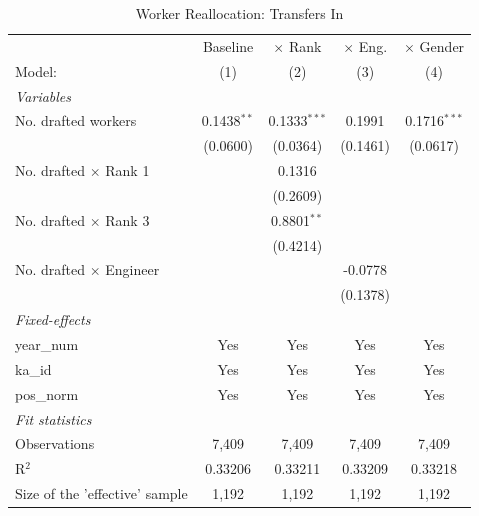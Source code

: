 \begin{table}[htbp]
\centering
\caption{Worker Reallocation: Transfers In}
\label{tab:reallocation}
\begin{threeparttable}
\begin{tabular}{lcccc}
   \tabularnewline \midrule \midrule
                                  & Baseline      & $\times$ Rank  & $\times$ Eng.  & $\times$ Gender \\    
   Model:                         & (1)           & (2)            & (3)            & (4)\\  
   \midrule
   \emph{Variables}\\
   No. drafted workers            & 0.1438$^{**}$ & 0.1333$^{***}$ & 0.1991         & 0.1716$^{***}$\\   
                                  & (0.0600)      & (0.0364)       & (0.1461)       & (0.0617)\\   
   No. drafted $\times$ Rank 1    &               & 0.1316         &                &   \\   
                                  &               & (0.2609)       &                &   \\   
   No. drafted $\times$ Rank 3    &               & 0.8801$^{**}$  &                &   \\   
                                  &               & (0.4214)       &                &   \\   
   No. drafted $\times$ Engineer  &               &                & -0.0778        &   \\   
                                  &               &                & (0.1378)       &   \\   
   \midrule
   \emph{Fixed-effects}\\
   year\_num                      & Yes           & Yes            & Yes            & Yes\\  
   ka\_id                         & Yes           & Yes            & Yes            & Yes\\  
   pos\_norm                      & Yes           & Yes            & Yes            & Yes\\  
   \midrule
   \emph{Fit statistics}\\
   Observations                   & 7,409         & 7,409          & 7,409          & 7,409\\  
   R$^2$                          & 0.33206       & 0.33211        & 0.33209        & 0.33218\\  
   Size of the 'effective' sample & 1,192         & 1,192          & 1,192          & 1,192\\  

\end{tabular}
\end{threeparttable}
\end{table}
